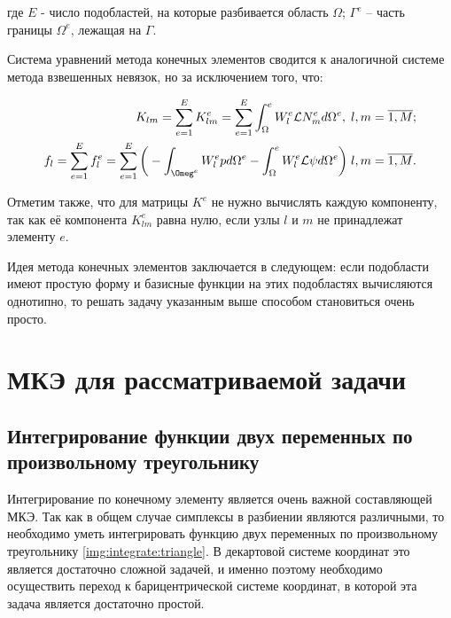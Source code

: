 \documentclass[14pt]{extreport}
\begin{document}
\noindent где $E$ - число подобластей, на которые разбивается область $\Omega$; $\Gamma^e$ -- часть границы $\Omega^e$, лежащая на $\Gamma$.

Система уравнений метода конечных элементов сводится к аналогичной системе метода взвешенных невязок, но за исключением того, что:

\begin{eqnarray}
K_{lm}=\sum\limits_{e=1}^{E} K_{lm}^{e}=\sum\limits_{e=1}^{E}\int_\Omega^{e} W_l^{e} \mathcal L N_{m}^{e}  d\Omega^{e}, \; l, m=\overline{1,M}; \\
f_l=\sum\limits_{e=1}^{E} f_{l}^{e}=\sum\limits_{e=1}^{E} \bigg(-\int_{\Omeg^{e}} W_{l}^{e} p d \Omega^{e} -\int_\Omega^{e} W_{l}^{e} \mathcal L \psi d \Omega^{e}\bigg) \; l, m=\overline{1,M}. 
\end{eqnarray}

Отметим также, что для матрицы $K^{e}$ не нужно вычислять каждую компоненту, так как её компонента $K_{lm}^{e}$ равна нулю, если узлы $l$ и $m$ не принадлежат элементу $e$. 

Идея метода конечных элементов заключается в следующем: если подобласти имеют простую форму и базисные функции на этих подобластях вычисляются однотипно, то решать задачу указанным выше способом становиться очень просто. 


\section{МКЭ для рассматриваемой задачи}


\subsection{Интегрирование функции двух переменных по произвольному треугольнику}

Интегрирование по конечному элементу является очень важной составляющей МКЭ. Так как в общем случае симплексы в разбиении являются различными, то необходимо уметь интегрировать функцию двух переменных по произвольному треугольнику \ref{img:integrate:triangle}. В декартовой системе координат это является достаточно сложной задачей, и именно поэтому необходимо осуществить переход к барицентрической системе координат, в которой эта задача является достаточно простой.
\end{document}

